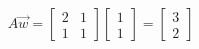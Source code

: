 \documentclass[preview]{standalone}
\begin{document}
\begin{align*}
A \vec{w} = \begin{bmatrix} 2 & 1 \\ 1 & 1 \end{bmatrix} \begin{bmatrix} 1 \\ 1 \end{bmatrix} = \begin{bmatrix} 3 \\ 2 \end{bmatrix}
\end{align*}
\end{document}
